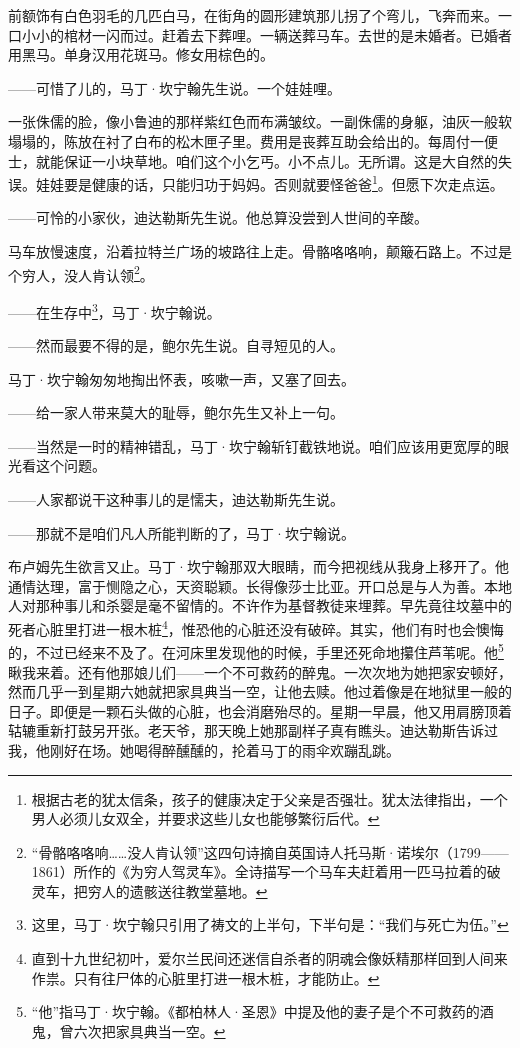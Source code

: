 \par 前额饰有白色羽毛的几匹白马，在街角的圆形建筑那儿拐了个弯儿，飞奔而来。一口小小的棺材一闪而过。赶着去下葬哩。一辆送葬马车。去世的是未婚者。已婚者用黑马。单身汉用花斑马。修女用棕色的。
\par ——可惜了儿的，马丁·坎宁翰先生说。一个娃娃哩。
\par 一张侏儒的脸，像小鲁迪的那样紫红色而布满皱纹。一副侏儒的身躯，油灰一般软塌塌的，陈放在衬了白布的松木匣子里。费用是丧葬互助会给出的。每周付一便士，就能保证一小块草地。咱们这个小乞丐。小不点儿。无所谓。这是大自然的失误。娃娃要是健康的话，只能归功于妈妈。否则就要怪爸爸\footnote{根据古老的犹太信条，孩子的健康决定于父亲是否强壮。犹太法律指出，一个男人必须儿女双全，并要求这些儿女也能够繁衍后代。}。但愿下次走点运。
\par ——可怜的小家伙，迪达勒斯先生说。他总算没尝到人世间的辛酸。
\par 马车放慢速度，沿着拉特兰广场的坡路往上走。骨骼咯咯响，颠簸石路上。不过是个穷人，没人肯认领\footnote{“骨骼咯咯响……没人肯认领”这四句诗摘自英国诗人托马斯·诺埃尔（1799——1861）所作的《为穷人驾灵车》。全诗描写一个马车夫赶着用一匹马拉着的破灵车，把穷人的遗骸送往教堂墓地。}。
\par ——在生存中\footnote{这里，马丁·坎宁翰只引用了祷文的上半句，下半句是：“我们与死亡为伍。”}，马丁·坎宁翰说。
\par ——然而最要不得的是，鲍尔先生说。自寻短见的人。
\par 马丁·坎宁翰匆匆地掏出怀表，咳嗽一声，又塞了回去。
\par ——给一家人带来莫大的耻辱，鲍尔先生又补上一句。
\par ——当然是一时的精神错乱，马丁·坎宁翰斩钉截铁地说。咱们应该用更宽厚的眼光看这个问题。
\par ——人家都说干这种事儿的是懦夫，迪达勒斯先生说。
\par ——那就不是咱们凡人所能判断的了，马丁·坎宁翰说。
\par 布卢姆先生欲言又止。马丁·坎宁翰那双大眼睛，而今把视线从我身上移开了。他通情达理，富于恻隐之心，天资聪颖。长得像莎士比亚。开口总是与人为善。本地人对那种事儿和杀婴是毫不留情的。不许作为基督教徒来埋葬。早先竟往坟墓中的死者心脏里打进一根木桩\footnote{直到十九世纪初叶，爱尔兰民间还迷信自杀者的阴魂会像妖精那样回到人间来作祟。只有往尸体的心脏里打进一根木桩，才能防止。}，惟恐他的心脏还没有破碎。其实，他们有时也会懊悔的，不过已经来不及了。在河床里发现他的时候，手里还死命地攥住芦苇呢。他\footnote{“他”指马丁·坎宁翰。《都柏林人·圣恩》中提及他的妻子是个不可救药的酒鬼，曾六次把家具典当一空。}瞅我来着。还有他那娘儿们——一个不可救药的醉鬼。一次次地为她把家安顿好，然而几乎一到星期六她就把家具典当一空，让他去赎。他过着像是在地狱里一般的日子。即便是一颗石头做的心脏，也会消磨殆尽的。星期一早晨，他又用肩膀顶着轱辘重新打鼓另开张。老天爷，那天晚上她那副样子真有瞧头。迪达勒斯告诉过我，他刚好在场。她喝得醉醺醺的，抡着马丁的雨伞欢蹦乱跳。

